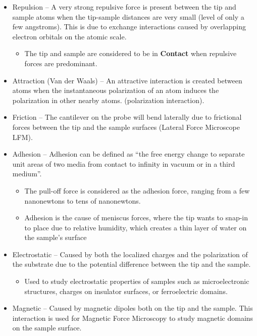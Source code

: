 \documentclass{../lab}
\begin{document}
    \begin{itemize}
        \item Repulsion – A very strong repulsive force is present between the tip and sample atoms when the tip-sample distances are very small (level of only a few angstroms).  This is due to exchange interactions caused by overlapping electron orbitals on the atomic scale.

        \begin{itemize}
            \item The tip and sample are considered to be in \textbf{Contact} when repulsive forces are predominant.

        \end{itemize}

        \item Attraction (Van der Waals) – An attractive interaction is created between atoms when the instantaneous polarization of an atom induces the polarization in other nearby atoms. (polarization interaction).

        \item Friction – The cantilever on the probe will bend laterally due to frictional forces between the tip and the sample surfaces (Lateral Force Microscope LFM).

        \item Adhesion – Adhesion can be defined as ``the free energy change to separate unit areas of two media from contact to infinity in vacuum or in a third medium''.

        \begin{itemize}
            \item The pull-off force is considered as the adhesion force, ranging from a few nanonewtons to tens of nanonewtons.

            \item Adhesion is the cause of meniscus forces, where the tip wants to snap-in to place due to relative humidity, which creates a thin layer of water on the sample’s surface

        \end{itemize}

        \item Electrostatic – Caused by both the localized charges and the polarization of the substrate due to the potential difference between the tip and the sample.

        \begin{itemize}
            \item Used to study electrostatic properties of samples such as microelectronic structures, charges on insulator surfaces, or ferroelectric domains.

        \end{itemize}

        \item Magnetic – Caused by magnetic dipoles both on the tip and the sample. This interaction is used for Magnetic Force Microscopy to study magnetic domains on the sample surface.

    \end{itemize}
\end{document}
